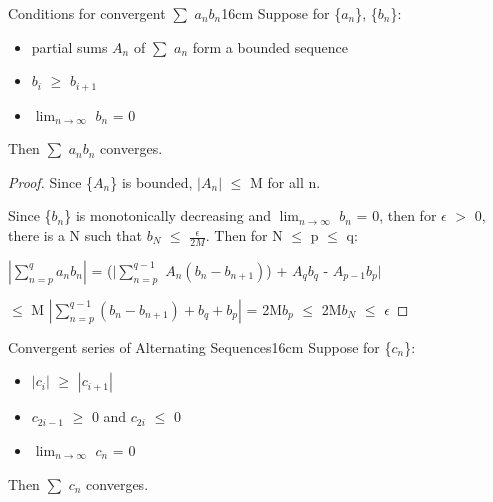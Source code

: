     \vspace{0.5cm}



    \begin{wtheorem}{Conditions for convergent $\sum$ $a_n b_n$}{16cm}
        Suppose for \{$a_n$\}, \{$b_n$\}:

        \begin{itemize}[leftmargin=1cm, itemsep=0.1cm]
            \item partial sums $A_n$ of $\sum$ $a_n$ form a bounded sequence
            
            \item $b_i$ $\geq$ $b_{i+1}$
            
            \item $\lim_{n \rightarrow \infty}$ $b_n$ = 0
        \end{itemize}

        Then $\sum$ $a_n b_n$ converges.
    \end{wtheorem}

    \begin{proof}
        Since \{$A_n$\} is bounded, $|A_n|$ $\leq$ M for all n.

        Since \{$b_n$\} is monotonically decreasing and
        $\lim_{n \rightarrow \infty}$ $b_n$ = 0, then
        for $\epsilon$ $>$ 0, there is a N such that
        $b_N$ $\leq$ $\frac{\epsilon}{2M}$.
        Then for N $\leq$ p $\leq$ q:

        \hspace{1cm}
        $| \sum_{n=p}^q a_n b_n |$
        = ($| \sum_{n = p}^{q-1}$ $A_n (b_n - b_{n+1})$)
        + $A_q b_q$ - $A_{p-1} b_p |$

        \hspace{3.3cm}
        $\leq$ M $| \sum_{n = p}^{q-1} (b_n - b_{n+1}) + b_q + b_p |$
        = 2M$b_p$
        $\leq$ 2M$b_N$
        $\leq$ $\epsilon$
    \end{proof}

    \newpage



    \begin{corollary}{Convergent series of Alternating Sequences}{16cm}
        Suppose for \{$c_n$\}:

        \begin{itemize}[leftmargin=1cm, itemsep=0.1cm]
            \item $|c_i|$ $\geq$ $|c_{i+1}|$
            
            \item $c_{2i-1}$ $\geq$ 0 and $c_{2i}$ $\leq$ 0
            
            \item $\lim_{n \rightarrow \infty}$ $c_n$ = 0
        \end{itemize}

        Then $\sum$ $c_n$ converges.
    \end{corollary}

